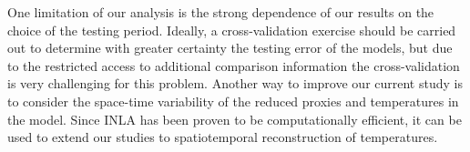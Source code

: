 \documentclass[12pt]{amsart}
\theoremstyle{plain}
\theoremstyle{definition}
\theoremstyle{remark}
\begin{document}
One limitation of our analysis is the strong
dependence of our results on the choice of the testing period. Ideally, a
cross-validation exercise should be carried out to determine with greater
certainty the testing error of the models, but due to the restricted access to
additional comparison information the cross-validation is very challenging for this problem. 
Another way to improve our current study is to consider the space-time variability of the reduced proxies and temperatures in the model. 
Since INLA has been proven to be computationally
efficient, it can be used to extend our studies to spatiotemporal reconstruction of temperatures.






\end{document}
